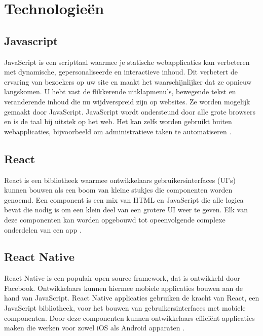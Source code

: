 \section{Technologieën}
\label{sec:technologieën}


\subsection{Javascript}
\label{sec:javascript}


JavaScript is een scripttaal waarmee je statische webapplicaties kan verbeteren met dynamische, gepersonaliseerde en interactieve inhoud. Dit verbetert de ervaring van bezoekers op uw site en maakt het waarschijnlijker dat ze opnieuw langskomen. U hebt vast de flikkerende uitklapmenu's, bewegende tekst en veranderende inhoud die nu wijdverspreid zijn op websites. Ze worden mogelijk gemaakt door JavaScript. JavaScript wordt ondersteund door alle grote browsers en is de taal bij uitstek op het web. Het kan zelfs worden gebruikt buiten webapplicaties, bijvoorbeeld om administratieve taken te automatiseren \autocite{Wilton2004}.

\subsection{React}
\label{sec:react}


React is een bibliotheek waarmee ontwikkelaars gebruikersinterfaces (UI's) kunnen bouwen als een boom van kleine stukjes die componenten worden genoemd. Een component is een mix van HTML en JavaScript die alle logica bevat die nodig is om een klein deel van een grotere UI weer te geven. Elk van deze componenten kan worden opgebouwd tot opeenvolgende complexe onderdelen van een app \autocite{Baer2018}.

\subsection{React Native}
\label{sec:react native}

React Native is een populair open-source framework, dat is ontwikkeld door Facebook. Ontwikkelaars kunnen hiermee mobiele applicaties bouwen aan de hand van JavaScript. React Native applicaties gebruiken de kracht van React, een JavaScript bibliotheek, voor het bouwen van gebruikersinterfaces met mobiele componenten. Door deze componenten kunnen ontwikkelaars efficiënt applicaties maken die werken voor zowel iOS als Android apparaten \autocite{Vinnik2021}.

